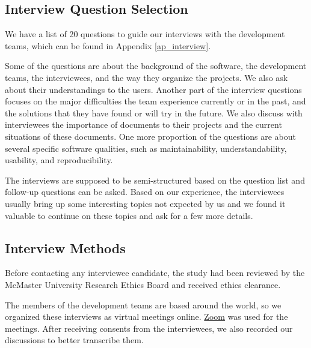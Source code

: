 \subsection{Interview Question Selection}

We have a list of 20 questions to guide our interviews with the development teams, which can be found in Appendix \ref{ap_interview}.

Some of the questions are about the background of the software, the development teams, the interviewees, and the way they organize the projects. We also ask about their understandings to the users. Another part of the interview questions focuses on the major difficulties the team experience currently or in the past, and the solutions that they have found or will try in the future. We also discuss with interviewees the importance of documents to their projects and the current situations of these documents. One more proportion of the questions are about several specific software qualities, such as maintainability, understandability, usability, and reproducibility.

The interviews are supposed to be semi-structured based on the question list and follow-up questions can be asked. Based on our experience, the interviewees usually bring up some interesting topics not expected by us and we found it valuable to continue on these topics and ask for a few more details.

\subsection{Interview Methods}
Before contacting any interviewee candidate, the study had been reviewed by the McMaster University Research Ethics Board and received ethics clearance.

The members of the development teams are based around the world, so we organized these interviews as virtual meetings online. \hyperlink{https://zoom.us/}{Zoom} was used for the meetings. After receiving consents from the interviewees, we also recorded our discussions to better transcribe them.
